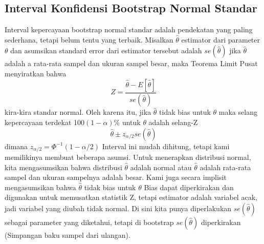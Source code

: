 \documentclass[a4paper,12pt]{article}
\theoremstyle{definition}
\begin{document}
\subsection{Interval Konfidensi Bootstrap Normal Standar}
Interval kepercayaan bootstrap normal standar adalah pendekatan yang paling sederhana, tetapi belum tentu yang terbaik. Misalkan $\widehat{\theta }$ estimator dari parameter $\theta $ dan asumsikan standard error dari estimator tersebut adalah $se\left ( \widehat{\theta } \right )$ jika $\widehat{\theta }$ adalah a rata-rata sampel dan ukuran sampel besar, maka Teorema Limit Pusat menyiratkan bahwa
\begin{equation*}
    Z = \frac{\widehat{\theta }- E[\widehat{\theta }]}{se \left ( \widehat{\theta } \right )}  
\end{equation*}
kira-kira standar normal. Oleh karena itu, jika $\widehat{\theta }$ tidak bias untuk $\theta$ maka selang kepercayaan terdekat 100$(1-\alpha)\%$ untuk $\theta$ adalah selang-Z
\begin{equation*}
    \widehat{\theta }\pm z_{\alpha/2 }se\left ( \widehat{\theta } \right )
\end{equation*}
dimana $z_{\alpha /2}=\Phi ^{-1}(1-\alpha /2)$ 
Interval ini mudah dihitung, tetapi kami memilikinya
membuat beberapa asumsi. Untuk menerapkan distribusi normal, kita mengasumsikan bahwa distribusi  $\widehat{\theta }$ adalah normal atau $\widehat{\theta }$ adalah rata-rata sampel dan ukuran sampelnya adalah besar. Kami juga secara implisit mengasumsikan bahwa $\widehat{\theta }$ tidak bias untuk $\theta$ Bias dapat diperkirakan dan digunakan untuk memusatkan statistik Z, tetapi estimator
adalah variabel acak, jadi variabel yang diubah tidak normal. Di sini kita punya diperlakukan $se(\widehat{\theta })$ sebagai parameter yang diketahui, tetapi di bootstrap $se(\widehat{\theta })$ diperkirakan (Simpangan baku sampel dari ulangan).
\end{document}
